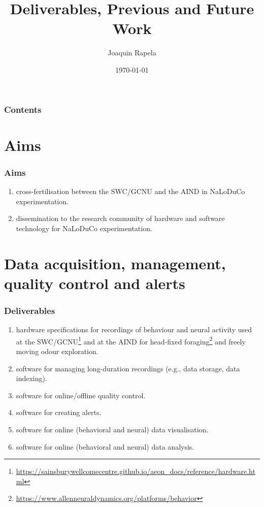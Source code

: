 \documentclass{beamer}
\title{Deliverables, Previous and Future Work}
\author{Joaquin Rapela}
\institute{Gatsby Computational Neuroscience Unit}
\date{\today}
\begin{document}
\frame{\titlepage}

\begin{frame}
    \frametitle{Contents}

    \tableofcontents

\end{frame}

\section{Aims}

\begin{frame}
    \frametitle{Aims}

\begin{enumerate}

    \item cross-fertilisation between the SWC/GCNU and the AIND in NaLoDuCo
        experimentation.

    \item dissemination to the research community of hardware and software
        technology for NaLoDuCo experimentation.

\end{enumerate}

\end{frame}

\section{Data acquisition, management, quality control and alerts}

\begin{frame}
    \frametitle{Deliverables}

    \begin{enumerate}

        \item hardware specifications for recordings of behaviour and neural
        activity used at the
        SWC/GCNU\footnote{\url{https://sainsburywellcomecentre.github.io/aeon\_docs/reference/hardware.html}}
        and at the AIND for head-fixed
        foraging\footnote{\url{https://www.allenneuraldynamics.org/platforms/behavior}}
        and freely moving odour exploration.

        \item software for managing long-duration recordings (e.g., data storage, data
        indexing).

        \item software for online/offline quality control.

        \item software for creating alerts.

        \item software for online (behavioral and neural) data visualisation.

        \item software for online (behavioral and neural) data analysis.

    \end{enumerate}

\end{frame}
\end{document}
